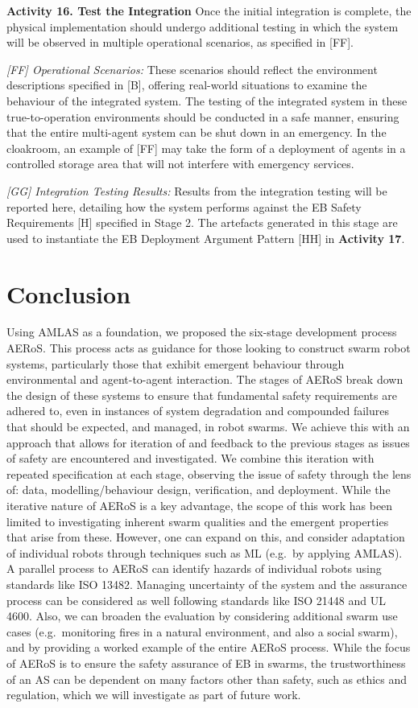 \documentclass[runningheads]{llncs}
\begin{document}
\noindent\textbf{Activity 16. Test the Integration} Once the initial integration is complete, the physical implementation should undergo additional testing in which the system will be observed in multiple operational scenarios, as specified in [FF].

\emph{[FF] Operational Scenarios:} These scenarios should reflect the environment descriptions specified in [B], offering real-world situations to examine the behaviour of the integrated system. The testing of the integrated system in these true-to-operation environments should be conducted in a safe manner, ensuring that the entire multi-agent system can be shut down in an emergency. 
In the cloakroom, an example of [FF] may take the form of a deployment of agents in a controlled storage area that will not interfere with emergency services.

\emph{[GG] Integration Testing Results:} Results from the integration testing will be reported here, detailing how the system performs against the EB Safety Requirements [H] specified in Stage 2. 
The artefacts generated in this stage are used to instantiate the EB Deployment Argument Pattern [HH] in \textbf{Activity 17}.

\section{Conclusion} \label{discussion-conclusions}
Using AMLAS \cite{Hawkins2021} as a foundation, we proposed the six-stage development process AERoS. This process acts as guidance for those looking to construct swarm robot systems, particularly those that exhibit emergent behaviour through environmental and agent-to-agent interaction. The stages of AERoS break down the design of these systems to ensure that fundamental safety requirements are adhered to, even in instances of system degradation and compounded failures that should be expected, and managed, in robot swarms. We achieve this with an approach that allows for iteration of and feedback to the previous stages as issues of safety are encountered and investigated. We combine this iteration with repeated specification at each stage, observing the issue of safety through the lens of: data, modelling/behaviour design, verification, and deployment. 
While the iterative nature of AERoS is a key advantage, the scope of this work has been limited to investigating inherent swarm qualities and the emergent properties that arise from these. 
However, one can expand on this, and consider adaptation of individual robots through techniques such as ML (e.g.\ by applying AMLAS). 
A parallel process to AERoS can identify hazards of individual robots using standards like ISO 13482. 
Managing uncertainty of the system and the assurance process can be considered as well following standards like ISO 21448 and UL 4600. 
Also, we can broaden the evaluation by considering additional swarm use cases (e.g.\ monitoring fires in a natural environment, and also a social swarm), and by providing a worked example of the entire AERoS process. 
While the focus of AERoS is to ensure the safety assurance of EB in swarms, the trustworthiness of an AS can be dependent on many factors other than safety, such as ethics and regulation, which we will investigate as part of future work.
\end{document}
